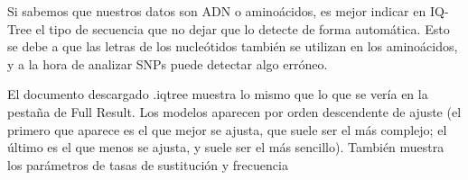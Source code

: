 Si sabemos que nuestros datos son ADN o aminoácidos, es mejor indicar en IQ-Tree el tipo de secuencia que no dejar que lo detecte de forma automática. Esto se debe a que las letras de los nucleótidos también se utilizan en los aminoácidos, y a la hora de analizar SNPs puede detectar algo erróneo. 

El documento descargado .iqtree muestra lo mismo que lo que se vería en la pestaña de Full Result. Los modelos aparecen por orden descendente de ajuste (el primero que aparece es el que mejor se ajusta, que suele ser el más complejo; el último es el que menos se ajusta, y suele ser el más sencillo). También muestra los parámetros de tasas de sustitución y frecuencia